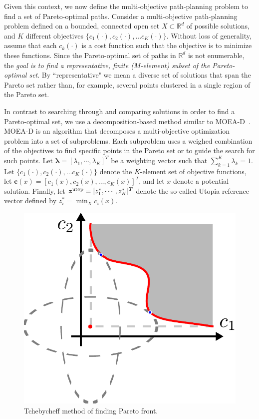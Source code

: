 \documentclass[phd]{byuprop}
\begin{document}
Given this context, we now define the multi-objective path-planning problem to find a set of Pareto-optimal paths.
Consider a multi-objective path-planning problem defined on a bounded, connected open set $X\subset\mathbb{R}^d$ of possible solutions, and $K$ different objectives $\{c_{1}(\cdot), c_{2}(\cdot), ... c_{K}(\cdot)\}$. 
Without loss of generality, assume that each $c_{k}(\cdot)$ is a cost function such that the objective is to minimize these functions.  
Since the Pareto-optimal set of paths in $ \mathbb{R}^{d} $ is not enumerable, the {\em goal is to find a representative, finite ($M$-element) subset of the Pareto-optimal set}.  
By ``representative" we mean a diverse set of solutions that span the Pareto set rather than, for example, several points clustered in a single region of the Pareto set.

In contrast to searching through and comparing solutions in order to find a Pareto-optimal set, we use a decomposition-based method similar to MOEA-D~\cite{Zhang2007}.  
MOEA-D is an algorithm that decomposes a multi-objective optimization problem into a set of subproblems.  
Each subproblem uses a weighed combination of the objectives to find specific points in the Pareto set or to guide the search for such points.  
Let $ \bm{\lambda} = [ \lambda_{1} , \cdots , \lambda_{K}  ]^{T} $ be a weighting vector such that $ \sum_{k=1}^{K} \lambda_{k} = 1 $.  
Let $\{c_{1}(\cdot), c_{2}(\cdot), \ldots c_{K}(\cdot)\}$ denote the $K$-element set of objective functions, let $\bm{c}(x) = [c_{1}(x), c_{2}(x), \ldots, c_{K}(x)]^T$, and let $x$ denote a potential solution.  
Finally, let $ \bm{z}^{\rm utop} = [z^{*}_{1}, \cdots , z^{*}_{K}]^{T} $ denote the so-called Utopia reference vector defined by $  z^{*}_{i} = \min_{ X } c_{i} (x) $. 

\begin{figure}
	\centering
	\includegraphics[width=0.3\linewidth]{fig/Tchebycheff}
	\caption{Tchebycheff method of finding Pareto front.}
	\label{fig:Tchebycheff}
\end{figure}
\end{document}
